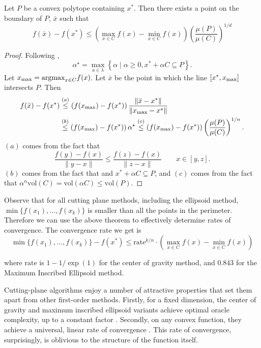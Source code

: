 \begin{lem}\label{lem:lem-voldecrease} Let $P$ be a convex polytope containing $x^*$. Then there exists a point on the boundary of $P$, $\bar{x}$ such that
$$
f(\bar{x})-f(x^{*})\leq\left(\max_{x\in C}f(x)-\min_{x\in C}f(x)\right)\left(\frac{\mu(P)}{\mu(C)}\right)^{1/d}
$$
\end{lem}
\begin{proof}
Following \cite{tarasov1988method},  
$$\alpha^\star = \max_{a\in\lambda}\left\{ \alpha\mid\alpha\geq0,x^*+\alpha C\subseteq P\right\}.$$ 
Let $x_{\max} = \mbox{argmax}_{x\in C} f(x)$. Let $\bar{x}$ be the point in which the line $[x^*, x_{\max} ]$ intersects $P$. Then
\begin{align*}
f(\bar{x})-f(x^{*}) & \overset{(a)}{\leq}\left(f(x_{\max})-f(x^{*})\right)\frac{\|\bar{x}-x^{*}\|}{\|x_{\max}-x^{*}\|}\\
 & \overset{(b)}{\leq}\left(f(x_{\max})-f(x^{*})\right)\alpha^\star
 \overset{(c)}{\leq}\left(f(x_{\max})-f(x^{*})\right)\left(\frac{\mu(P)}{\mu(C)}\right)^{1/n}.
\end{align*}
$(a)$ comes from the fact that $$\frac{f(y)-f(x)}{\|y-x\|}\leq\frac{f(z)-f(x)}{\|z-x\|} \qquad x \in [y,z].$$$(b)$ comes from the fact that and $x^* + \alpha C \subseteq P$, and $(c)$ comes from the fact that $\alpha^n \mbox{vol}(C) =  \mbox{vol}(\alpha C) \leq \mbox{vol}(P).$
\end{proof}


Observe that for all cutting plane methods, including the ellipsoid method, $\min\{f(x_1),\dots, f(x_k)\}$ is smaller than all the points in the perimeter. Therefore we can use the above theorem to effectively determine rates of convergence. The convergence rate we get is
$$
\min\{f(x_{1}),\dots,f(x_{k})\}-f(x^{*})\leq \mbox{rate}^{k/n}\cdot\left(\max_{x\in C}f(x)-\min_{x\in C}f(x)\right)
$$

where $\mbox{rate}$ is $1 - 1/\exp(1)$ for the center of gravity method, and
$0.843$ for the Maximum Inscribed Ellipsoid method.

Cutting-plane algorithms enjoy a number of attractive properties that
set them apart from other first-order methods.  Firstly, for a fixed
dimension, the center of gravity and maximum inscribed ellipsoid
variants achieve optimal oracle complexity, up to a constant factor
\cite{nemirovski1994efficient}. Secondly, on any convex function, they
achieve a universal, linear rate of convergence
\cite{nemirovski1994efficient}. This rate of convergence,
surprisingly, is oblivious to the structure of the function itself.

